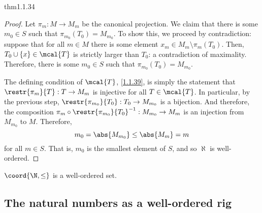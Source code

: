 \begin{thm}{}{thm1.1.34}
\begin{proof}
Let $\pi _m:M\rightarrow M_m$ be the canonical projection.  We claim that there is some $m_0\in S$ such that $\pi _{m_0}(T_0)=M_{m_0}$.  To show this, we proceed by contradiction:  suppose that for all $m\in M$ there is some element $x_m\in M_m\setminus \pi _m(T_0)$.  Then, $T_0\cup \{ x\}\in \mcal{T}$ is strictly larger than $T_0$:  a contradiction of maximality.  Therefore, there is some $m_0\in S$ such that $\pi _{m_0}(T_0)=M_{m_0}$.

The defining condition of $\mcal{T}$, \eqref{1.1.39}, is simply the statement that $\restr{\pi _m}{T}:T\rightarrow M_m$ is injective for all $T\in \mcal{T}$.  In particular, by the previous step, $\restr{\pi _{m_0}}{T_0}:T_0\rightarrow M_{m_0}$ is a bijection.  And therefore, the composition $\pi _m\circ \restr{\pi _{m_0}}{T_0}^{-1}:M_{m_0}\rightarrow M_m$ is an injection from $M_{m_0}$ to $M$.  Therefore,
\begin{equation}
m_0=\abs{M_{m_0}}\leq \abs{M_m}=m
\end{equation}
for all $m\in S$.  That is, $m_0$ is the smallest element of $S$, and so $\aleph$ is well-ordered.
\end{proof}
\end{thm}
\begin{crl}{}{}
$\coord{\N ,\leq}$ is a well-ordered set.
\end{crl}

\subsection{The natural numbers as a well-ordered rig}


